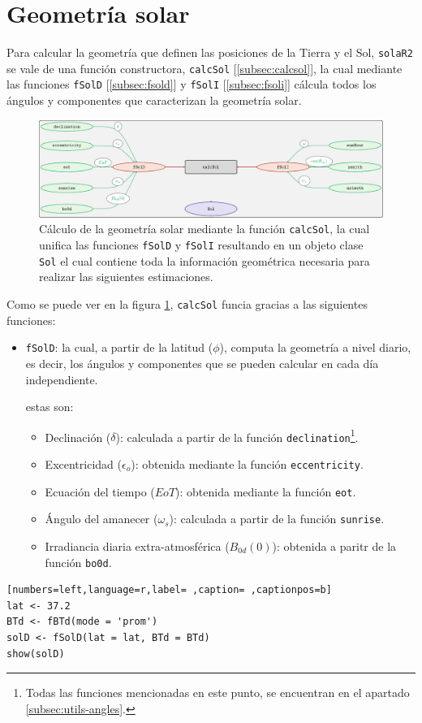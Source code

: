 \section{Geometría solar}
\label{sec:orgf9e8602}
\label{sec:geometria-solar}
Para calcular la geometría que definen las posiciones de la Tierra y el Sol, \texttt{solaR2} se vale de una función constructora, \texttt{calcSol} [\ref{subsec:calcsol}], la cual mediante las funciones \texttt{fSolD} [\ref{subsec:fsold}] y \texttt{fSolI} [\ref{subsec:fsoli}] cálcula todos los ángulos y componentes que caracterizan la geometría solar.
\begin{figure}[]
\centering
\includegraphics[keepaspectratio,width=\textwidth,height=0.5\textheight]{figuras/calcSol.pdf}
\caption{Cálculo de la geometría solar mediante la función \texttt{calcSol}, la cual unifica las funciones \texttt{fSolD} y \texttt{fSolI} resultando en un objeto clase \texttt{Sol} el cual contiene toda la información geométrica necesaria para realizar las siguientes estimaciones. \label{fig:calcSol}}
\end{figure}

Como se puede ver en la figura \ref{fig:calcSol}, \texttt{calcSol} funcia gracias a las siguientes funciones:
\begin{itemize}
\item \texttt{fSolD}: la cual, a partir de la latitud (\(\phi\)), computa la geometría a nivel diario, es decir, los ángulos y componentes que se pueden calcular en cada día independiente.

estas son:
\begin{itemize}
\item Declinación (\(\delta\)): calculada a partir de la función \texttt{declination}\footnote{Todas las funciones mencionadas en este punto, se encuentran en el apartado \ref{subsec:utils-angles}.}.
\item Excentricidad (\(\epsilon_o\)): obtenida mediante la función \texttt{eccentricity}.
\item Ecuación del tiempo (\(EoT\)): obtenida mediante la función \texttt{eot}.
\item Ángulo del amanecer (\(\omega_s\)): calculada a partir de la función \texttt{sunrise}.
\item Irradiancia diaria extra-atmosférica (\(B_{0d}(0)\)): obtenida a paritr de la función \texttt{bo0d}.
\end{itemize}
\end{itemize}
\begin{lstlisting}[numbers=left,language=r,label= ,caption= ,captionpos=b]
lat <- 37.2
BTd <- fBTd(mode = 'prom')
solD <- fSolD(lat = lat, BTd = BTd)
show(solD)
\end{lstlisting}

